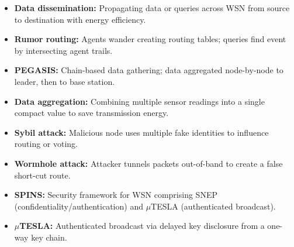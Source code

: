 \documentclass[12pt,a4paper]{article}
\begin{document}
\begin{tcolorbox}[defbox, title={\textbf{One-Line Definitions}}]
\begin{itemize}[leftmargin=*, itemsep=3pt]
  \item \textbf{Data dissemination:} Propagating data or queries across WSN from source to destination with energy efficiency.
  \item \textbf{Rumor routing:} Agents wander creating routing tables; queries find event by intersecting agent trails.
  \item \textbf{PEGASIS:} Chain-based data gathering; data aggregated node-by-node to leader, then to base station.
  \item \textbf{Data aggregation:} Combining multiple sensor readings into a single compact value to save transmission energy.
  \item \textbf{Sybil attack:} Malicious node uses multiple fake identities to influence routing or voting.
  \item \textbf{Wormhole attack:} Attacker tunnels packets out-of-band to create a false short-cut route.
  \item \textbf{SPINS:} Security framework for WSN comprising SNEP (confidentiality/authentication) and $\mu$TESLA (authenticated broadcast).
  \item \textbf{$\mu$TESLA:} Authenticated broadcast via delayed key disclosure from a one-way key chain.
\end{itemize}
\end{tcolorbox}
\end{document}
